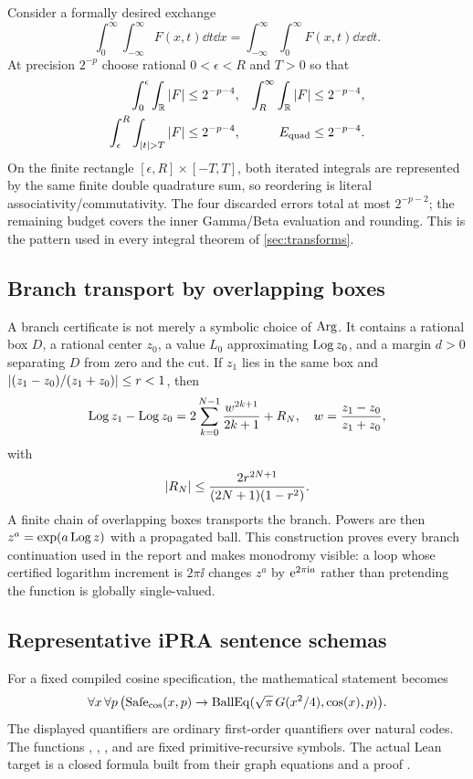 Consider a formally desired exchange
\[
 \int_0^\infty\int_{-\infty}^{\infty}F(x,t)\dd t\dd x
 =\int_{-\infty}^{\infty}\int_0^\infty F(x,t)\dd x\dd t.
\]
At precision $2^{-p}$ choose rational $0<\epsilon<R$ and $T>0$ so that
\begin{align*}
 \int_0^\epsilon\int_{\R}\abs F&\le2^{-p-4},&
 \int_R^\infty\int_{\R}\abs F&\le2^{-p-4},\\
 \int_\epsilon^R\int_{\abs t>T}\abs F&\le2^{-p-4},&
 E_{\rm quad}&\le2^{-p-4}.
\end{align*}
On the finite rectangle $[\epsilon,R]\times[-T,T]$, both iterated integrals
are represented by the same finite double quadrature sum, so reordering is
literal associativity/commutativity.  The four discarded errors total at most
$2^{-p-2}$; the remaining budget covers the inner Gamma/Beta evaluation and
rounding.  This is the pattern used in every integral theorem of
\cref{sec:transforms}.

\subsection{Branch transport by overlapping boxes}

A branch certificate is not merely a symbolic choice of $\operatorname{Arg}$.  It contains a
rational box $D$, a rational center $z_0$, a value $L_0$ approximating
$\operatorname{Log} z_0$, and a margin $d>0$ separating $D$ from zero and the cut.  If
$z_1$ lies in the same box and
$\left|(z_1-z_0)/(z_1+z_0)\right|\le r<1$, then
\begin{equation}\label{eq:appendix-log-step}
 \operatorname{Log} z_1-\operatorname{Log} z_0
 =2\sum_{k=0}^{N-1}\frac{w^{2k+1}}{2k+1}+R_N,
 \quad w=\frac{z_1-z_0}{z_1+z_0},
\end{equation}
with
\[
 \left|R_N\right|\le\frac{2r^{2N+1}}{(2N+1)(1-r^2)}.
\]
A finite chain of overlapping boxes transports the branch.  Powers are then
$z^a=\exp(a\operatorname{Log} z)$ with a propagated ball.  This construction proves every
branch continuation used in the report and makes monodromy visible: a loop
whose certified logarithm increment is $2\pi\ii$ changes $z^a$ by
$\mathrm e^{2\pi\mathrm i a}$ rather than pretending the function is globally
single-valued.

\subsection{Representative iPRA sentence schemas}

For a fixed compiled cosine specification, the mathematical statement becomes
\[
 \forall x\,\forall p\,
 \bigl(\operatorname{Safe}_{\cos}(x,p)\to
 \operatorname{BallEq}(\sqrt\pi\,G(x^2/4),\cos(x),p)\bigr).
\]
The displayed quantifiers are ordinary first-order quantifiers over natural
codes.  The functions , , , and
 are fixed primitive-recursive symbols.  The actual Lean target is
a closed formula built from their graph equations and a proof
.

